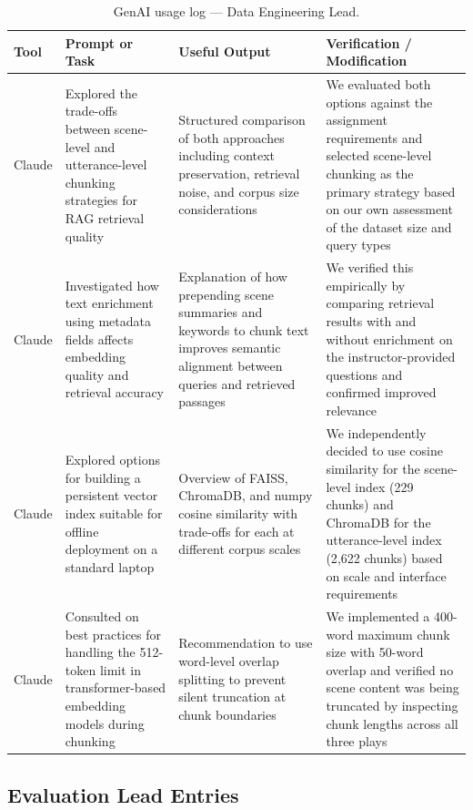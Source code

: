 \documentclass[10pt,conference]{IEEEtran}
\begin{document}
\begin{table}[h]
\centering
\caption{GenAI usage log --- Data Engineering Lead.}
\label{tab:genai-log-bobby}
\begin{tabularx}{\textwidth}{p{1.5cm} p{3.5cm} p{3.5cm} X}
\toprule
Tool & Prompt or Task & Useful Output & Verification / Modification \\
\midrule
Claude & Explored the trade-offs between scene-level and
utterance-level chunking strategies for RAG retrieval quality &
Structured comparison of both approaches including context
preservation, retrieval noise, and corpus size considerations &
We evaluated both options against the assignment requirements and
selected scene-level chunking as the primary strategy based on
our own assessment of the dataset size and query types \\
Claude & Investigated how text enrichment using metadata fields
affects embedding quality and retrieval accuracy & Explanation of
how prepending scene summaries and keywords to chunk text improves
semantic alignment between queries and retrieved passages & We
verified this empirically by comparing retrieval results with and
without enrichment on the instructor-provided questions and
confirmed improved relevance \\
Claude & Explored options for building a persistent vector index
suitable for offline deployment on a standard laptop & Overview of
FAISS, ChromaDB, and numpy cosine similarity with trade-offs for
each at different corpus scales & We independently decided to use
cosine similarity for the scene-level index (229 chunks) and
ChromaDB for the utterance-level index (2{,}622 chunks) based on
scale and interface requirements \\
Claude & Consulted on best practices for handling the 512-token
limit in transformer-based embedding models during chunking &
Recommendation to use word-level overlap splitting to prevent
silent truncation at chunk boundaries & We implemented a 400-word
maximum chunk size with 50-word overlap and verified no scene
content was being truncated by inspecting chunk lengths across all
three plays \\
\bottomrule
\end{tabularx}
\end{table}

\subsection*{Evaluation Lead Entries}
\end{document}
